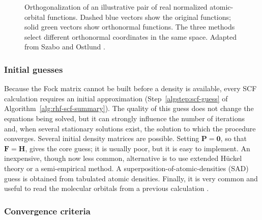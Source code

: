 \documentclass[11pt,a4paper,titlepage]{article}
\numberwithin{equation}{section}
\newcommand{\bF}{\boldsymbol{F}}
\newcommand{\bH}{\boldsymbol{H}}
\newcommand{\bO}{\boldsymbol{0}}
\newcommand{\bP}{\boldsymbol{P}}
\begin{document}
\begin{figure}[htbp]

  \caption{Orthogonalization of an illustrative pair of real normalized
  atomic-orbital functions. Dashed blue vectors show the original functions;
  solid green vectors show orthonormal functions. The three methods select
  different orthonormal coordinates in the same space. Adapted from Szabo
  and Ostlund \citep{SzaboOstlund1996}.}
  \label{fig:ao-orthogonalization}
\end{figure}

\subsubsection{Initial guesses}

Because the Fock matrix cannot be built before a density is available, every
SCF calculation requires an initial approximation
(Step~\ref{algstep:scf-guess} of Algorithm~\ref{alg:rhf-scf-summary}).
The quality of this guess
does not change the equations being solved, but it can strongly influence the
number of iterations and, when several stationary solutions exist, the
solution to which the procedure converges.
Several initial density matrices are possible. Setting $\bP=\bO$, so
that $\bF=\bH$, gives the core guess; it is usually poor, but it is
easy to implement. An inexpensive, though now less common, alternative is to
use extended H\"uckel theory or a semi-empirical method. A
superposition-of-atomic-densities (SAD) guess is obtained from
tabulated atomic densities. Finally, it is very common and useful to
read the molecular orbitals from a previous calculation \citep{Lehtola2019}.

\subsubsection{Convergence criteria}
\end{document}
